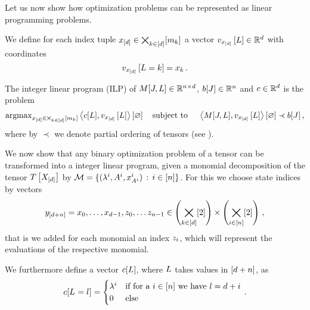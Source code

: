 
Let us now show how optimization problems can be represented as linear programming problems.

We define for each index tuple $x_{[d]}\in\bigtimes_{k\in[d]}[m_{k}]$ a vector $v_{x_{[d]}}\left[L\right]\in\mathbb{R}^{d}$ with coordinates
\[ v_{x_{[d]}}\left[L=k\right] = x_{k} \, .  \]

\begin{definition}
    The integer linear program (ILP) of $M[J,L]\in\mathbb{R}^{n \times d}$, $b[J]\in\mathbb{R}^{n}$ and $c\in\mathbb{R}^{d}$ is the problem
    \begin{align*}
        \mathrm{argmax}_{x_{[d]}\in\bigtimes_{k\in[d]}[m_{k}]} \left\langle c[L], v_{x_{[d]}}\left[L\right]\right\rangle \left[ \varnothing \right]
        \quad \text{subject to } \quad \left\langle M[J,L],v_{x_{[d]}}\left[L\right]\right\rangle \left[ \varnothing \right] \prec b[J] \, ,
    \end{align*}
    where by $\prec$ we denote partial ordering of tensors (see ).
\end{definition}


We now show that any binary optimization problem of a tensor can be transformed into a integer linear program, given a monomial decomposition of the tensor $T\left[X_{[d]}\right]$ by $\mathcal{M}=\{(\lambda^{i}, A^{i}, x_{A^{i}}^{i}) \, : \, i\in[n]\}$.
For this we choose state indices by vectors
\begin{align*}
    y_{[d+n]} = x_{0},\ldots,x_{d-1},z_{0},\ldots z_{n-1} \in \left(\bigtimes_{k\in[d]}[2]\right) \times  \left(\bigtimes_{i\in[n]}[2]\right) \, ,
\end{align*}
that is we added for each monomial an index $z_{i}$, which will represent the evaluations of the respective monomial.


We furthermore define a vector $c[L]$, where $L$ takes values in $[d+n]$, as
\begin{align}
    \label{eq:ilpPotential}
    c[L_{}=l_{}] =
    \begin{cases}
        \lambda^{i} & \text{if for a } i\in[n] \text{ we have } l = d + i \\
        0 & \text{else}
    \end{cases} \, .
\end{align}

